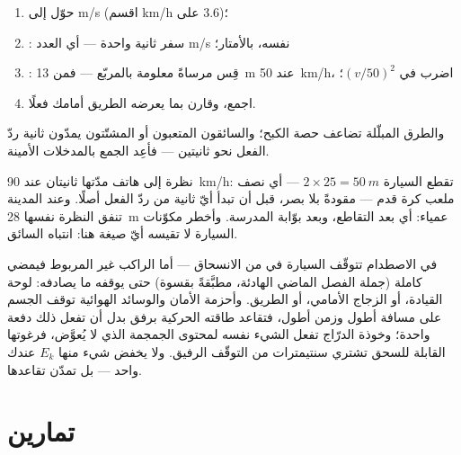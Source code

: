 \begin{method}\label{met:g9:kinetic-energy-safety:estimate}
\begin{enumerate}
  \item حوّل  إلى \unit{m/s} (اقسم \unit{km/h} على
        $3.6$)؛
  \item {}: سفر ثانية واحدة --- أي العدد 
        \unit{m/s} نفسه، بالأمتار؛
  \item {}: قِس مرساةً معلومة بالمربّع --- فمن
        \qty{13}{m} عند \qty{50}{km/h}، اضرب في $(v/50)^2$؛
  \item اجمع، وقارن بما يعرضه الطريق أمامك فعلًا.
\end{enumerate}
والطرق المبلّلة تضاعف حصة الكبح؛ والسائقون المتعبون أو
المشتّتون يمدّون ثانية ردّ الفعل نحو ثانيتين --- فأعِد الجمع
بالمدخلات الأمينة.
\end{method}

\begin{example}\label{ex:g9:kinetic-energy-safety:glance}
نظرة إلى هاتف مدّتها ثانيتان عند \qty{90}{km/h}: تقطع السيارة
$2 \times 25 = \qty{50}{m}$ --- أي نصف ملعب كرة قدم ---
مقودةً بلا بصر، قبل أن تبدأ أيّ ثانية من ردّ الفعل أصلًا. وعند
 المدينة تنفق النظرة نفسها \qty{28}{m} عمياء: أي بعد
التقاطع، وبعد بوّابة المدرسة. وأخطر مكوّنات السيارة لا تقيسه
أيّ صيغة هنا: انتباه السائق.
\end{example}

\begin{remark}\label{rem:g9:kinetic-energy-safety:belts}
في الاصطدام تتوقّف السيارة في  من الانسحاق --- أما الراكب
غير المربوط فيمضي  كاملة (جملة الفصل الماضي الهادئة،
مطبَّقةً بقسوة) حتى يوقفه ما يصادفه: لوحة القيادة، أو الزجاج
الأمامي، أو الطريق. وأحزمة الأمان والوسائد الهوائية توقف الجسم
على مسافة أطول وزمن أطول، فتقاعد طاقته الحركية برفق بدل أن
تفعل ذلك دفعة واحدة؛ وخوذة الدرّاج تفعل الشيء نفسه لمحتوى
الجمجمة الذي لا يُعوَّض، فرغوتها القابلة للسحق تشتري سنتيمترات
من التوقّف الرفيق. ولا يخفض شيء منها $E_k$ عندك  واحد ---
بل تمدّن تقاعدها.
\end{remark}

\section{تمارين}

